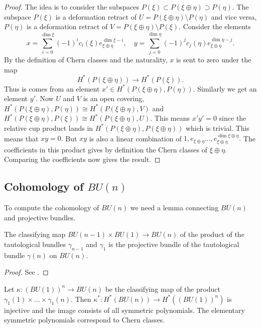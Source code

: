 \documentclass[a4paper,openany]{scrbook}
\begin{document}
\begin{proof}
The idea is to consider the subspaces $P(\xi)\subset P(\xi\oplus\eta) \supset P(\eta).$ The subspace $P(\xi)$ is a deformation retract of $U=P(\xi\oplus\eta)\setminus P(\eta)$ and vice versa, $P(\eta)$ is a deformation retract of $V=P(\xi\oplus\eta)\setminus P(\xi).$ Consider the elements $$x=\sum_{i=0}^{\dim \xi}(-1)^ic_i(\xi)e_{\xi\oplus\eta}^{\dim \xi -i},\quad y=\sum_{j=0}^{\dim \eta}(-1)^jc_j(\eta)e_{\xi\oplus\eta}^{\dim \eta -j}.$$ By the definition of Chern classes and the naturality, $x$ is sent to zero under the map $$H^*(P(\xi\oplus\eta))\rightarrow H^*(P(\xi)).$$ Thus is comes from an element $x' \in H^*(P(\xi\oplus\eta),P(\eta)).$ Similarly we get an element $y'.$ Now $U$ and $V$ is an open covering, $H^*(P(\xi\oplus\eta),P(\eta))\cong H^*(P(\xi\oplus\eta),V)$ and $H^*(P(\xi\oplus\eta),P(\xi))\cong H^*(P(\xi\oplus\eta),U).$ This means $x'y'=0$ since the relative cup product lands in $H^*(P(\xi\oplus\eta),P(\xi\oplus\eta))$ which is trivial. This means that $xy=0.$ But $xy$ is also a linear combination of $1,e_{\xi\oplus\eta}\dots, e_{\xi\oplus\eta}^{\dim \xi\oplus\eta}.$ The coefficients in this product gives by definition the Chern classes of $\xi\oplus\eta.$ Comparing the coefficients now gives the result.
\end{proof}



\subsection{Cohomology of $BU(n)$}\label{subsec:cohomologyBU}

To compute the cohomology of $BU(n)$ we need a lemma connecting $BU(n)$ and projective bundles.

\begin{lemma}\label{lemma:projectivebundleBU(n))}
The classifying map $BU(n-1)\times BU(1)\rightarrow BU(n)$ of the product of the tautological bundles $\gamma_{n-1}$ and $\gamma_1$ is the projective bundle of the tautological bundle $\gamma(n)$ on $BU(n).$
\end{lemma}

\begin{proof}
See \cite[Theorem 19.3.1]{tomdieck:algebraic-topology}.
\end{proof}

\begin{thm}
Let $\kappa: (BU(1))^n \rightarrow BU(n)$ be the classifying map of the product $\gamma_1(1)\times \dots \times \gamma_1(n).$ Then $\kappa^*:H^*(BU(n)) \rightarrow H^*((BU(1))^n)$ is injective and the image consists of all symmetric polynomials. The elementary symmetric polynomials correspond to Chern classes.
\end{thm}
\end{document}
